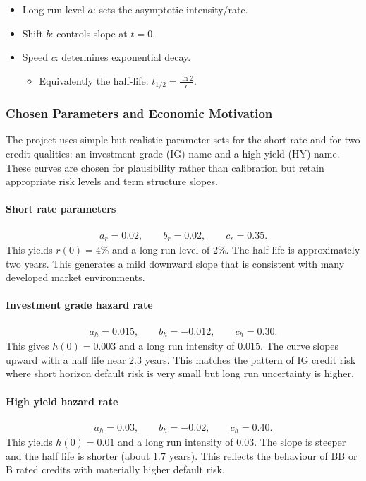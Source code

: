 \begin{itemize}
    \item Long-run level $a$: sets the asymptotic intensity/rate.
    \item Shift $b$: controls slope at $t=0$. 
    \item Speed $c$: determines exponential decay. 
    \begin{itemize}
        \item Equivalently the half-life: $t_{1/2} = \frac{\ln 2}{c}.$
    \end{itemize}
\end{itemize} 

\subsubsection*{Chosen Parameters and Economic Motivation}

The project uses simple but realistic parameter sets for the short rate and for two credit qualities: an investment grade (IG) name and a high yield (HY) name. These curves are chosen for plausibility rather than calibration but retain appropriate risk levels and term structure slopes.

\paragraph{Short rate parameters}
\begin{align*}
a_r = 0.02, \qquad b_r = 0.02, \qquad c_r = 0.35.
\end{align*}
This yields $r(0) = 4\%$ and a long run level of $2\%$. The half life is approximately two years. This generates a mild downward slope that is consistent with many developed market environments.

\paragraph{Investment grade hazard rate}
\begin{align*}
a_h = 0.015, \qquad b_h = -0.012, \qquad c_h = 0.30.
\end{align*}
This gives $h(0) = 0.003$ and a long run intensity of $0.015$. The curve slopes upward with a half life near 2.3 years. This matches the pattern of IG credit risk where short horizon default risk is very small but long run uncertainty is higher.

\paragraph{High yield hazard rate}
\begin{align*}
a_h = 0.03, \qquad b_h = -0.02, \qquad c_h = 0.40.
\end{align*}
This yields $h(0) = 0.01$ and a long run intensity of $0.03$. The slope is steeper and the half life is shorter (about 1.7 years). This reflects the behaviour of BB or B rated credits with materially higher default risk.


